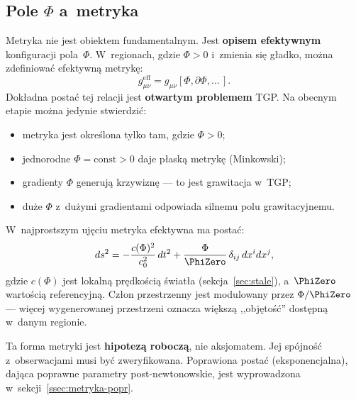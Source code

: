 \subsection{Pole $\Phi$ a~metryka}\label{ssec:metryka}

Metryka nie jest obiektem fundamentalnym. Jest \textbf{opisem
efektywnym} konfiguracji pola~$\Phi$. W~regionach, gdzie
$\Phi > 0$ i~zmienia si\k{e} g\l{}adko, mo\.zna zdefiniowa\'c
efektywn\k{a} metryk\k{e}:
\begin{equation}\label{eq:metric-from-Phi}
    g_{\mu\nu}^{\mathrm{eff}} = g_{\mu\nu}[\Phi, \partial\Phi, \ldots\,].
\end{equation}
Dok\l{}adna posta\'c tej relacji jest \textbf{otwartym problemem} TGP.
Na obecnym etapie mo\.zna jedynie stwierdzi\'c:
\begin{itemize}[nosep]
  \item metryka jest okre\'slona tylko tam, gdzie $\Phi > 0$;
  \item jednorodne $\Phi = \mathrm{const} > 0$ daje p\l{}ask\k{a}
        metryk\k{e} (Minkowski);
  \item gradienty $\Phi$ generuj\k{a} krzywizn\k{e} --- to jest
        grawitacja w~TGP;
  \item du\.ze $\Phi$ z~du\.zymi gradientami odpowiada silnemu
        polu grawitacyjnemu.
\end{itemize}

\begin{hypothesis}\label{hyp:metric}
W~najprostszym uj\k{e}ciu metryka efektywna ma posta\'c:
\begin{equation}\label{eq:metric-minimal}
    ds^2 = -\frac{c(\Phi)^2}{c_0^2}\,dt^2
    + \frac{\Phi}{\PhiZero}\,\delta_{ij}\,dx^i dx^j,
\end{equation}
gdzie $c(\Phi)$ jest lokaln\k{a} pr\k{e}dko\'sci\k{a} \'swiat\l{}a
(sekcja~\ref{sec:stale}), a~$\PhiZero$ warto\'sci\k{a} referencyjn\k{a}.
Cz\l{}on przestrzenny jest modulowany przez $\Phi/\PhiZero$ ---
wi\k{e}cej wygenerowanej przestrzeni oznacza wi\k{e}ksz\k{a}
,,obj\k{e}to\'s\'c'' dost\k{e}pn\k{a} w~danym regionie.
\end{hypothesis}

Ta forma metryki jest \textbf{hipotez\k{a} robocz\k{a}}, nie
aksjomatem. Jej sp\'ojno\'s\'c z~obserwacjami musi by\'c
zweryfikowana. Poprawiona posta\'c (eksponencjalna), daj\k{a}ca
poprawne parametry post-newtonowskie, jest wyprowadzona
w~sekcji~\ref{ssec:metryka-popr}.

